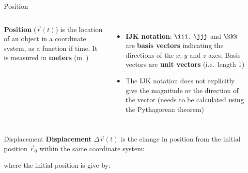 \documentclass[12pt,compress,aspectratio=169,dvipsnames]{beamer}
\begin{document}
\begin{frame}{Position}
  \begin{columns}
    \textbf{Position} ($\vec r(t)$) is the location of an object in a coordinate
    system, as a function if time. It is measured in \textbf{meters}
    (\si\metre).

    \begin{itemize}
    \item\textbf{IJK notation}: $\iii$, $\jjj$ and $\kkk$ are \textbf{basis
      vectors} indicating the directions of the $x$, $y$ and $z$ axes. Basis
      vectors are \textbf{unit vectors} (i.e.\ length $1$)
    \item The IJK notation does not explicitly give the magnitude or the
      direction of the vector (needs to be calculated using the Pythagorean
      theorem)
    \end{itemize}

  \end{columns}
\end{frame}



\begin{frame}{Displacement}
  \textbf{Displacement} $\Delta\vec r(t)$ is the change in position from the
  initial position $\vec r_0$ within the same coordinate system:


  where the initial position is give by:

  
\end{frame}
\end{document}
